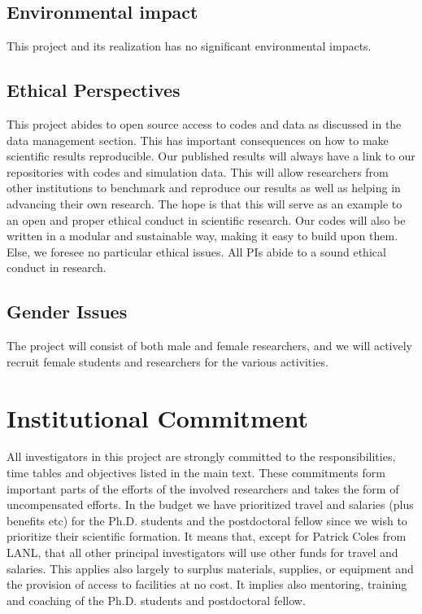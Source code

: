 \documentclass[10pt]{article}
\begin{document}
\subsection{Environmental impact}

This project and its realization has no  significant environmental impacts.

\subsection{Ethical Perspectives}

This project abides to open source access to codes and data as discussed in the data management section. This has important consequences on how to make scientific results reproducible. Our published results will always have a link to our repositories with codes and simulation data. This will allow researchers from other institutions to benchmark and reproduce our results as well as helping in advancing their own 
research. The hope is that this will serve as an example to an open and proper ethical conduct in scientific research.  Our codes will also be written in a modular and sustainable way, making it easy to build upon them. 
Else, we foresee no particular ethical issues. All PIs abide to a sound ethical conduct in research.

\subsection{Gender Issues}


The project will consist of both male and female researchers, and we
will actively recruit female students and researchers for the various activities. 


\section{Institutional Commitment}

 
All investigators in this project are strongly committed to the responsibilities, time tables and objectives listed in the main text. These commitments form important parts of the efforts of the involved researchers and takes the form of uncompensated efforts. In the budget we have prioritized travel and salaries (plus benefits etc) for the Ph.D. students and the postdoctoral fellow since we wish to prioritize their scientific formation. It means that, except for Patrick Coles from LANL, that all other principal investigators will use other funds for travel and salaries. 
This applies also largely to surplus materials, supplies, or equipment and  the provision of access to facilities at no cost. It implies also mentoring, training and coaching of the Ph.D. students and postdoctoral fellow. 
\clearpage
\appendix
\end{document}
